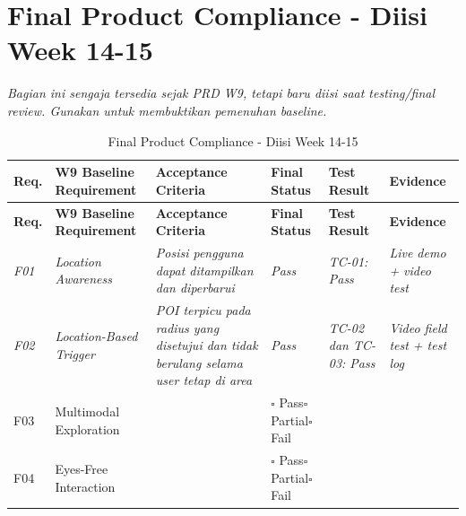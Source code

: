 \chapter{Final Product Compliance - Diisi Week 14-15}
\label{bab:final-product-compliance-diisi-week-14-15}
\textit{Bagian ini sengaja tersedia sejak PRD W9, tetapi baru diisi saat testing/final review. Gunakan untuk membuktikan pemenuhan baseline.}

\begin{longtable}{|L{0.072}|L{0.191}|L{0.271}|L{0.135}|L{0.163}|L{0.168}|}
\caption{Final Product Compliance - Diisi Week 14-15}\\
\hline
{}\textbf{Req.} & \textbf{W9 Baseline Requirement} & \textbf{Acceptance Criteria} & \textbf{Final Status} & \textbf{Test Result} & \textbf{Evidence} \\ \hline
\endfirsthead
\hline
{}\textbf{Req.} & \textbf{W9 Baseline Requirement} & \textbf{Acceptance Criteria} & \textbf{Final Status} & \textbf{Test Result} & \textbf{Evidence} \\ \hline
\endhead
{}\textit{F01} & \textit{Location Awareness} & \textit{Posisi pengguna dapat ditampilkan dan diperbarui} & \textit{Pass} & \textit{TC-01: Pass} & \textit{Live demo + video test} \\ \hline
{}\textit{F02} & \textit{Location-Based Trigger} & \textit{POI terpicu pada radius yang disetujui dan tidak berulang selama user tetap di area} & \textit{Pass} & \textit{TC-02 dan TC-03: Pass} & \textit{Video field test + test log} \\ \hline
F03 & Multimodal Exploration &  & \(\square\) Pass\newline \(\square\) Partial\newline \(\square\) Fail &  &  \\ \hline
F04 & Eyes-Free Interaction &  & \(\square\) Pass\newline \(\square\) Partial\newline \(\square\) Fail &  &  \\ \hline

\end{longtable}
